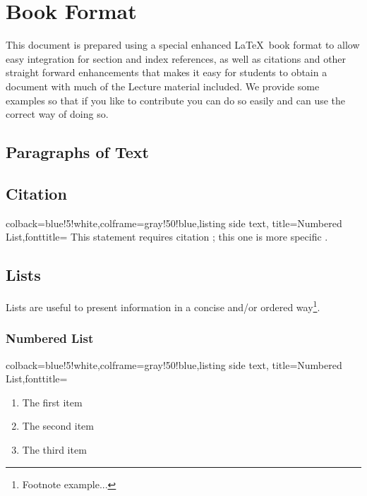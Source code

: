 

\chapter{Book Format}

\FILENAME

This document is prepared using a special enhanced \LaTeX~book format to allow
easy integration for section and index references, as well as
citations and other straight forward enhancements that makes it easy
for students to obtain a document with much of the Lecture material
included. We provide some examples so that if you like to contribute
you can do so easily and can use the correct way of doing so.


\section{Paragraphs of Text}

\lipsum[1] %


\section{Citation}

\begin{tcblisting}{colback=blue!5!white,colframe=gray!50!blue,listing side text,
  title=Numbered List,fonttitle=\bfseries}
This statement requires citation \cite{article_key}; 
this one is more specific \cite[162]{book_key}.
\end{tcblisting}


\section{Lists}

Lists are useful to present information in a concise and/or ordered way\footnote{Footnote example...}.

\subsection{Numbered List}

\begin{tcblisting}{colback=blue!5!white,colframe=gray!50!blue,listing side text,
  title=Numbered List,fonttitle=\bfseries}
\begin{enumerate}
\item The first item
\item The second item
\item The third item
\end{enumerate}
\end{tcblisting}

